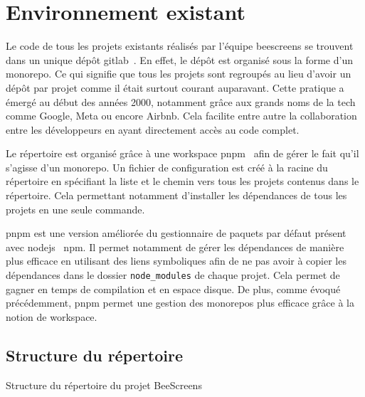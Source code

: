 \section{Environnement existant}

Le code de tous les projets existants réalisés par l'équipe \gls{beescreens} se trouvent dans un unique dépôt \gls{gitlab}~\cite{beescreens}. En effet, le dépôt est organisé sous la forme d'un monorepo. Ce qui signifie que  tous les projets sont regroupés au lieu d'avoir un dépôt par projet comme il était surtout courant auparavant. Cette pratique a émergé au début des années 2000, notamment grâce aux grands noms de la tech comme Google, Meta ou encore Airbnb. Cela facilite entre autre la collaboration entre les développeurs en ayant directement accès au code complet.

Le répertoire est organisé grâce à une workspace \gls{pnpm}~\cite{pnpmworkspace} afin de gérer le fait qu'il s'agisse d'un monorepo. Un fichier de configuration est créé à la racine du répertoire en spécifiant la liste et le chemin vers tous les projets contenus dans le répertoire. Cela permettant notamment d'installer les dépendances de tous les projets en une seule commande.

\gls{pnpm} est une version améliorée du gestionnaire de paquets par défaut présent avec \gls{nodejs}~\cite{nodejs} \gls{npm}. Il permet notamment de gérer les dépendances de manière plus efficace en utilisant des liens symboliques afin de ne pas avoir à copier les dépendances dans le dossier \texttt{node_modules} de chaque projet. Cela permet de gagner en temps de compilation et en espace disque. De plus, comme évoqué précédemment, \gls{pnpm} permet une gestion des monorepos plus efficace grâce à la notion de workspace.

\subsection{Structure du répertoire}

\begin{listing}[H]
  \begin{tcolorbox}[arc=0mm,colback=white!5!white]
  \end{tcolorbox}
  \caption{Structure du répertoire du projet BeeScreens}
  \label{listing:beescreeens-repo-structure}
\end{listing}

